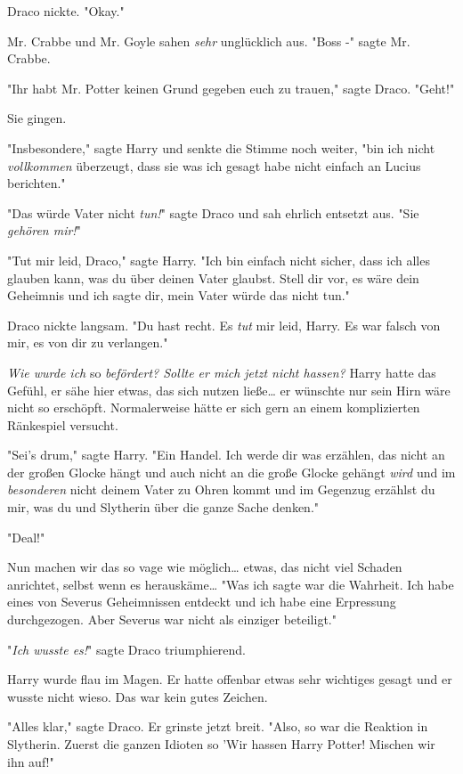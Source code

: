{Draco nickte. "Okay."

Mr. Crabbe und Mr. Goyle sahen \emph{sehr} unglücklich aus. "Boss -" sagte Mr. Crabbe.

"Ihr habt Mr. Potter keinen Grund gegeben euch zu trauen," sagte Draco. "Geht!"

Sie gingen.

"Insbesondere," sagte Harry und senkte die Stimme noch weiter, "bin ich nicht \emph{vollkommen} überzeugt, dass sie was ich gesagt habe nicht einfach an Lucius berichten."

"Das würde Vater nicht \emph{tun!}" sagte Draco und sah ehrlich entsetzt aus. "Sie \emph{gehören mir!}"

"Tut mir leid, Draco," sagte Harry. "Ich bin einfach nicht sicher, dass ich alles glauben kann, was du über deinen Vater glaubst. Stell dir vor, es wäre dein Geheimnis und ich sagte dir, mein Vater würde das nicht tun."

Draco nickte langsam. "Du hast recht. Es \emph{tut} mir leid, Harry. Es war falsch von mir, es von dir zu verlangen."

\emph{Wie wurde ich} so \emph{befördert? Sollte er mich jetzt nicht hassen?} Harry hatte das Gefühl, er sähe hier etwas, das sich nutzen ließe… er wünschte nur sein Hirn wäre nicht so erschöpft. Normalerweise hätte er sich gern an einem komplizierten Ränkespiel versucht.

"Sei's drum," sagte Harry. "Ein Handel. Ich werde dir was erzählen, das nicht an der großen Glocke hängt und auch nicht an die große Glocke gehängt \emph{wird} und im \emph{besonderen} nicht deinem Vater zu Ohren kommt und im Gegenzug erzählst du mir, was du und Slytherin über die ganze Sache denken."

"Deal!"

Nun machen wir das so vage wie möglich… etwas, das nicht viel Schaden anrichtet, selbst wenn es herauskäme… "Was ich sagte war die Wahrheit. Ich habe eines von Severus Geheimnissen entdeckt und ich habe eine Erpressung durchgezogen. Aber Severus war nicht als einziger beteiligt."

"\emph{Ich wusste es!}" sagte Draco triumphierend.

Harry wurde flau im Magen. Er hatte offenbar etwas sehr wichtiges gesagt und er wusste nicht wieso. Das war kein gutes Zeichen.

"Alles klar," sagte Draco. Er grinste jetzt breit. "Also, so war die Reaktion in Slytherin. Zuerst die ganzen Idioten so 'Wir hassen Harry Potter! Mischen wir ihn auf!"

}
